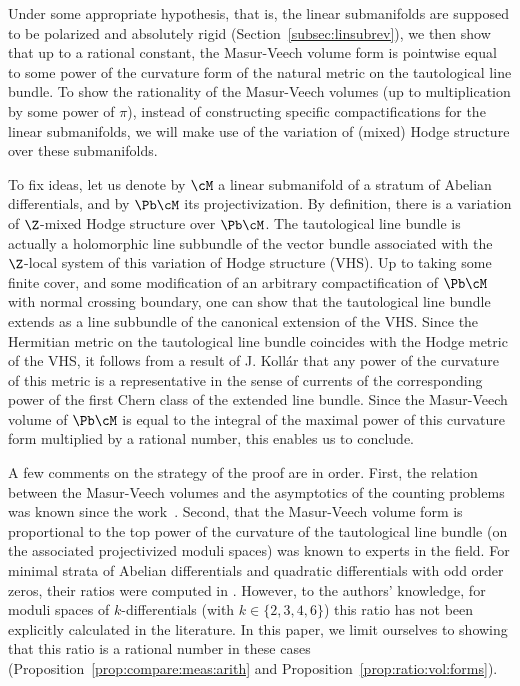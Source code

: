 Under some appropriate hypothesis, that is, the linear submanifolds are supposed to be polarized and absolutely rigid (\cf Section~\ref{subsec:linsubrev}), we then show that up to a rational constant, the Masur-Veech volume form is pointwise equal to some power of the curvature form of the natural metric on the tautological line bundle.
To show the rationality of the Masur-Veech volumes (up to multiplication by some power of $\pi$), instead of constructing specific compactifications for the linear submanifolds, we will make use of the variation of (mixed) Hodge structure over these submanifolds.

To fix ideas, let us denote by $\cM$ a linear submanifold of a stratum of Abelian differentials, and by $\Pb\cM$ its projectivization.
By definition, there is a variation of $\Z$-mixed Hodge structure over $\Pb\cM$.
The tautological line bundle is actually a holomorphic line subbundle of the vector bundle associated with the $\Z$-local system of this variation of Hodge structure (VHS).
Up to taking some finite cover, and some modification of an arbitrary compactification of $\Pb\cM$ with normal crossing boundary, one can show that the tautological line bundle extends as a line subbundle of the canonical extension of the VHS.
Since the Hermitian metric on the tautological line bundle coincides with the Hodge metric of the VHS, it follows from a result of J. Kollár \cite{Kollar87} that any power of the curvature of this metric is a representative in the sense of currents of the corresponding power of the first Chern class of the extended line bundle. Since the Masur-Veech volume of $\Pb\cM$ is equal to the integral of the maximal power of this curvature form multiplied by a rational number, this enables us to conclude.

A few comments on the strategy of the proof are in order. First, the relation between the Masur-Veech volumes and the asymptotics of the counting problems was known since the work~\cite{EO01}. Second, that the Masur-Veech volume form is proportional to the top power of the curvature of the tautological line bundle (on the associated projectivized moduli spaces) was known to experts in the field.
For minimal strata of Abelian differentials and quadratic differentials with odd order zeros, their ratios were computed in \cite{Sau18, CMS19}.
However, to the authors' knowledge, for moduli spaces of $k$-differentials (with $k\in \{2,3,4,6\}$) this ratio has not been explicitly calculated in the literature.
In this paper, we limit ourselves to showing that this ratio is a rational number in these cases (\cf Proposition~\ref{prop:compare:meas:arith} and Proposition~\ref{prop:ratio:vol:forms}).

